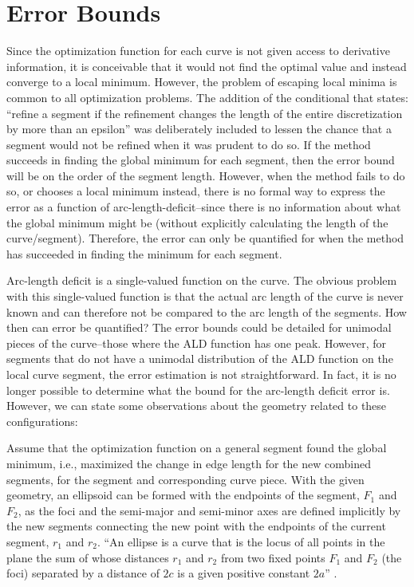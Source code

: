 \section{Error Bounds}
Since the optimization function for each curve is not given access to 
derivative information, it is conceivable that it would not find the 
optimal value and instead converge to a local minimum.  However, the 
problem of escaping local minima is common to all optimization problems.  
The addition of the conditional that states: ``refine a segment if the 
refinement changes the length of the entire discretization by more than an 
epsilon'' was deliberately included to lessen the chance that a segment 
would not be refined when it was prudent to do so.  If the method succeeds 
in finding the global minimum for each segment, then the error bound will 
be on the order of the segment length.  However, when the method fails to 
do so, or chooses a local minimum instead, there is no formal way to 
express the error as a function of arc-length-deficit--since there is no 
information about what the global minimum might be (without explicitly 
calculating the length of the curve/segment).  Therefore, the error can 
only be quantified for when the method has succeeded in finding the 
minimum for each segment.

Arc-length deficit is a single-valued function on the curve.  The 
obvious 
problem with this single-valued function is that the actual arc length of 
the curve is never known and can therefore not be compared to the 
arc length of the segments.  How then can error be quantified? The error 
bounds could be detailed for unimodal pieces of the curve--those where the 
ALD function has one peak.  However, for segments that do not have a 
unimodal distribution of the ALD function on the local curve segment, the 
error estimation is not straightforward.  In fact, it is no longer 
possible to determine what the bound for the arc-length deficit error is.  
However, we can state some observations about the geometry related to 
these configurations:

Assume that the optimization function on a general segment found the 
global minimum, i.e., maximized the change in edge length for the new 
combined segments, for the segment and corresponding curve piece.  With the given geometry, an ellipsoid can be formed with the endpoints of the segment, $F_1$ and $F_2$, as the foci and the semi-major and semi-minor axes are defined implicitly by the new segments connecting the new point with the endpoints of the current segment, $r_1$ and $r_2$.  ``An ellipse is a curve that is the locus of all points in the plane the sum of whose distances $r_1$ and $r_2$ from two fixed points $F_1$ and $F_2$ (the foci) separated by a distance of $2c$ is a given positive constant $2a$'' \cite{weissteineEllipse}.  

